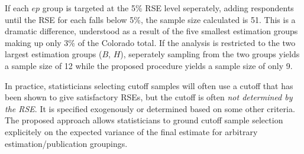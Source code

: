 \documentclass[11pt]{article}\usepackage[]{graphicx}\usepackage[]{color}
\begin{document}
If each $ep$ group is targeted at the 5\% RSE level seperately, adding respondents until the RSE for each falls below 5\%, the sample size calculated is 51. This is a dramatic difference, understood as a result of the five smallest estimation groups making up only 3\% of the Colorado total. If the analysis is restricted to the two largest estimation groups ($B$, $H$), seperately sampling from the two groups yields a sample size of 12 while the proposed procedure yields a sample size of only 9. 

In practice, statisticians selecting cutoff samples will often use a cutoff that has been shown to give satisfactory RSEs, but the cutoff is often \emph{not determined by the RSE}. It is specified exogenously or determined based on some other criteria. The proposed approach allows statisticians to ground cutoff sample selection explicitely on the expected variance of the final estimate for arbitrary estimation/publication groupings.



\end{document}
